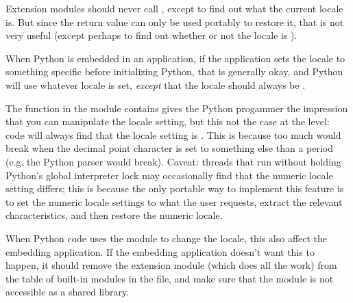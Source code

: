 Extension modules should never call , except to
find out what the current locale is.  But since the return value can
only be used portably to restore it, that is not very useful (except
perhaps to find out whether or not the locale is ).

When Python is embedded in an application, if the application sets the
locale to something specific before initializing Python, that is
generally okay, and Python will use whatever locale is set,
\emph{except} that the  locale should always be
.

The  function in the  module contains
gives the Python progammer the impression that you can manipulate the
 locale setting, but this not the case at the \C{}
level: \C{} code will always find that the  locale
setting is .  This is because too much would break when the
decimal point character is set to something else than a period
(e.g. the Python parser would break).  Caveat: threads that run
without holding Python's global interpreter lock may occasionally find
that the numeric locale setting differs; this is because the only
portable way to implement this feature is to set the numeric locale
settings to what the user requests, extract the relevant
characteristics, and then restore the  numeric locale.

When Python code uses the  module to change the locale,
this also affect the embedding application.  If the embedding
application doesn't want this to happen, it should remove the
 extension module (which does all the work) from the
table of built-in modules in the  file, and make sure
that the  module is not accessible as a shared library.

